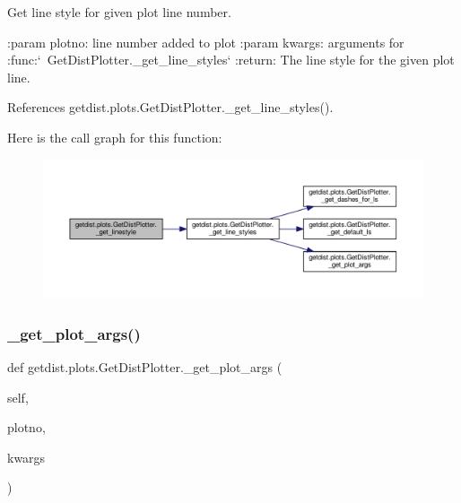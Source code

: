 \begin{DoxyVerb}Get line style for given plot line number.

:param plotno: line number added to plot
:param kwargs: arguments for :func:`~GetDistPlotter._get_line_styles`
:return: The line style for the given plot line.
\end{DoxyVerb}
 

References getdist.\+plots.\+Get\+Dist\+Plotter.\+\_\+get\+\_\+line\+\_\+styles().

Here is the call graph for this function\+:
\nopagebreak
\begin{figure}[H]
\begin{center}
\leavevmode
\includegraphics[width=350pt]{classgetdist_1_1plots_1_1GetDistPlotter_ac59e8aaef9e884dfd9fe405a57673dbe_cgraph}
\end{center}
\end{figure}
\mbox{\label{classgetdist_1_1plots_1_1GetDistPlotter_a3611eb8b23f9f095922b216ead8d83ce}} 
\subsubsection{\texorpdfstring{\+\_\+get\+\_\+plot\+\_\+args()}{\_get\_plot\_args()}}
{\footnotesize\ttfamily def getdist.\+plots.\+Get\+Dist\+Plotter.\+\_\+get\+\_\+plot\+\_\+args (\begin{DoxyParamCaption}\item[{}]{self,  }\item[{}]{plotno,  }\item[{}]{kwargs }\end{DoxyParamCaption})\hspace{0.3cm}{\ttfamily [private]}}

